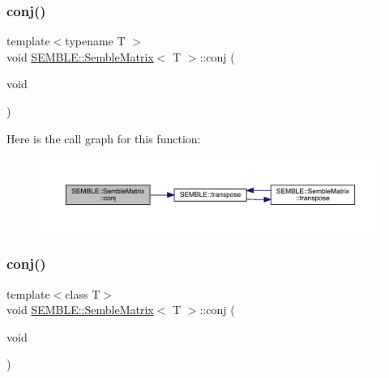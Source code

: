 \mbox{\label{structSEMBLE_1_1SembleMatrix_ae1a1e21202bf3bb9198e8f769a3c9697}} 
\subsubsection{\texorpdfstring{conj()}{conj()}\hspace{0.1cm}{\footnotesize\ttfamily [1/2]}}
{\footnotesize\ttfamily template$<$typename T $>$ \\
void \mbox{\hyperlink{structSEMBLE_1_1SembleMatrix}{S\+E\+M\+B\+L\+E\+::\+Semble\+Matrix}}$<$ T $>$\+::conj (\begin{DoxyParamCaption}\item[{void}]{ }\end{DoxyParamCaption})}

Here is the call graph for this function\+:
\nopagebreak
\begin{figure}[H]
\begin{center}
\leavevmode
\includegraphics[width=350pt]{df/d87/structSEMBLE_1_1SembleMatrix_ae1a1e21202bf3bb9198e8f769a3c9697_cgraph}
\end{center}
\end{figure}
\mbox{\label{structSEMBLE_1_1SembleMatrix_ae1a1e21202bf3bb9198e8f769a3c9697}} 
\subsubsection{\texorpdfstring{conj()}{conj()}\hspace{0.1cm}{\footnotesize\ttfamily [2/2]}}
{\footnotesize\ttfamily template$<$class T$>$ \\
void \mbox{\hyperlink{structSEMBLE_1_1SembleMatrix}{S\+E\+M\+B\+L\+E\+::\+Semble\+Matrix}}$<$ T $>$\+::conj (\begin{DoxyParamCaption}\item[{void}]{ }\end{DoxyParamCaption})}

